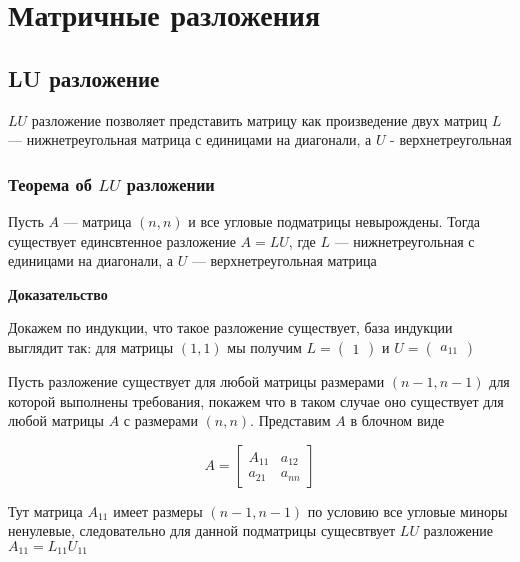 \documentclass{article}
\begin{document}
    \section{Матричные разложения}

    \subsection{LU разложение}

    $LU$ разложение позволяет представить матрицу как произведение 
    двух матриц $L$ --- нижнетреугольная матрица с единицами на диагонали, а $U$ - верхнетреугольная 

    \subsubsection{Теорема об $LU$ разложении}

    Пусть $A$ --- матрица $(n, n)$ и все угловые подматрицы невырождены.
    Тогда существует единсвтенное разложение $A = LU$, где $L$ --- нижнетреугольная 
    с единицами на диагонали, а $U$ --- верхнетреугольная матрица 

    \quad 

    \textbf{Доказательство}

    \quad 

    Докажем по индукции, что такое разложение существует, база индукции выглядит так: для матрицы $(1, 1)$ мы получим
    $L = \left(\begin{smallmatrix} 1 \end{smallmatrix}\right)$ и $U = \left(\begin{smallmatrix} a_{11} \end{smallmatrix}\right)$

    \quad 

    Пусть разложение существует для любой матрицы размерами $(n - 1, n - 1)$ для которой выполнены требования, 
    покажем что в таком случае оно существует для любой матрицы $A$ с размерами $(n, n)$. Представим $A$ в блочном виде

    \begin{equation}
        A = \begin{bmatrix}
            A_{11} & a_{12} \\ a_{21} & a_{nn}
        \end{bmatrix}
    \end{equation}

    Тут матрица $A_{11}$ имеет размеры $(n - 1, n - 1)$ по условию все угловые миноры ненулевые, следовательно для данной подматрицы сущесвтвует 
    $LU$ разложение $A_{11} = L_{11}U_{11}$
\end{document}
